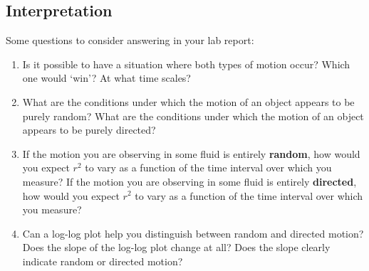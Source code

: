 \subsection*{Interpretation}
Some questions to consider answering in your lab report:
\begin{enumerate}
\item Is it possible to have a situation where both types of motion occur? Which one would `win'? At what time scales?
\item What are the conditions under which the motion of an object appears to be purely random? What are the conditions under which the motion of an object appears to be purely directed? 
\item If the motion you are observing in some fluid is entirely \textbf{random}, how would you expect $r^{2}$ to vary as a function of the time interval over which you measure? If the motion you are observing in some fluid is entirely \textbf{directed}, how would you expect $r^{2}$ to vary as a function of the time interval over which you measure? 
\item Can a log-log plot help you distinguish between random and directed motion? Does the slope of the log-log plot change at all? Does the slope clearly indicate random or directed motion? 
\end{enumerate}
%
%

